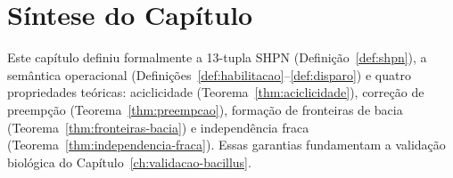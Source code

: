 \section{Síntese do Capítulo}
\label{sec:sintese-cap3}

Este capítulo definiu formalmente a 13-tupla SHPN
(Definição~\ref{def:shpn}), a semântica operacional
(Definições~\ref{def:habilitacao}--\ref{def:disparo}) e quatro propriedades
teóricas: aciclicidade (Teorema~\ref{thm:aciclicidade}), correção de preempção
(Teorema~\ref{thm:preempcao}), formação de fronteiras de bacia
(Teorema~\ref{thm:fronteiras-bacia}) e independência fraca
(Teorema~\ref{thm:independencia-fraca}).
Essas garantias fundamentam a validação biológica do
Capítulo~\ref{ch:validacao-bacillus}.
